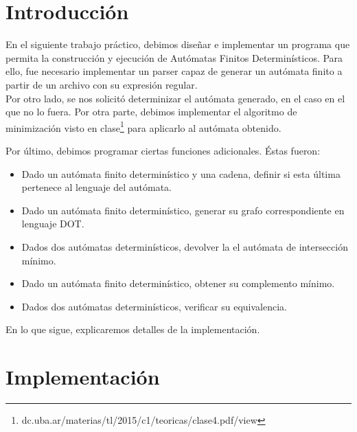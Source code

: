 \documentclass[a4paper, 10pt, twoside]{article}
\begin{document}
\newpage

\tableofcontents

\newpage



\section{Introducción}
En el siguiente trabajo práctico, debimos diseñar e implementar un programa que permita la construcción y ejecución de Autómatas Finitos Determinísticos. Para ello, fue necesario implementar un parser capaz de generar un autómata finito a partir de un archivo con su expresión regular.\\
Por otro lado, se nos solicitó determinizar el autómata generado, en el caso en el que no lo fuera. Por otra parte, debimos implementar el algoritmo de minimización visto en clase\footnote{dc.uba.ar/materias/tl/2015/c1/teoricas/clase4.pdf/view} para aplicarlo al autómata obtenido.

Por último, debimos programar ciertas funciones adicionales. Éstas fueron:
\begin{itemize}
\item Dado un autómata finito determinístico y una cadena, definir si esta última pertenece al lenguaje del autómata.
\item Dado un autómata finito determinístico, generar su grafo correspondiente en lenguaje DOT.
\item Dados dos autómatas determinísticos, devolver la el autómata de intersección mínimo.
\item Dado un autómata finito determinístico, obtener su complemento mínimo.
\item Dados dos autómatas determinísticos, verificar su equivalencia.
\end{itemize} 

En lo que sigue, explicaremos detalles de la implementación.
\newpage
\section{Implementación}
\end{document}
